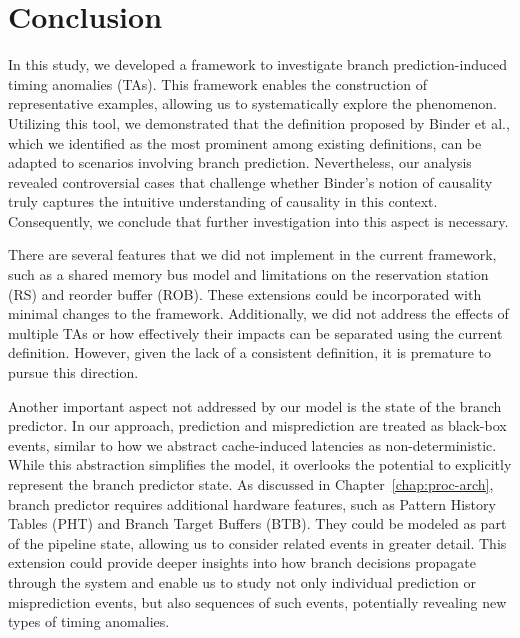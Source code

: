 \chapter{Conclusion}
In this study, we developed a framework to investigate branch prediction-induced timing anomalies (TAs). This framework enables the construction of representative examples, allowing us to systematically explore the phenomenon. Utilizing this tool, we demonstrated that the definition proposed by Binder et al., which we identified as the most prominent among existing definitions, can be adapted to scenarios involving branch prediction. Nevertheless, our analysis revealed controversial cases that challenge whether Binder's notion of causality truly captures the intuitive understanding of causality in this context. Consequently, we conclude that further investigation into this aspect is necessary.

There are several features that we did not implement in the current framework, such as a shared memory bus model and limitations on the reservation station (RS) and reorder buffer (ROB). These extensions could be incorporated with minimal changes to the framework. Additionally, we did not address the effects of multiple TAs or how effectively their impacts can be separated using the current definition. However, given the lack of a consistent definition, it is premature to pursue this direction.

Another important aspect not addressed by our model is the state of the branch predictor. In our approach, prediction and misprediction are treated as black-box events, similar to how we abstract cache-induced latencies as non-deterministic. While this abstraction simplifies the model, it overlooks the potential to explicitly represent the branch predictor state. As discussed in Chapter~\ref{chap:proc-arch}, branch predictor requires additional hardware features, such as Pattern History Tables (PHT) and Branch Target Buffers (BTB). They could be modeled as part of the pipeline state, allowing us to consider related events in greater detail. This extension could provide deeper insights into how branch decisions propagate through the system and enable us to study not only individual prediction or misprediction events, but also sequences of such events, potentially revealing new types of timing anomalies.

